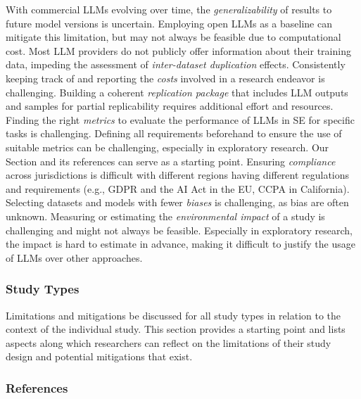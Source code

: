 With commercial LLMs evolving over time, the \emph{generalizability} of results to future model versions is uncertain.
Employing open LLMs as a baseline can mitigate this limitation, but may not always be feasible due to computational cost.
Most LLM providers do not publicly offer information about their training data, impeding the assessment of \emph{inter-dataset duplication} effects.
Consistently keeping track of and reporting the \emph{costs} involved in a research endeavor is challenging.
Building a coherent \emph{replication package} that includes LLM outputs and samples for partial replicability requires additional effort and resources.
Finding the right \emph{metrics} to evaluate the performance of LLMs in SE for specific tasks is challenging.
Defining all requirements beforehand to ensure the use of suitable metrics can be challenging, especially in exploratory research.
Our Section \benchmarksmetrics and its references can serve as a starting point.
Ensuring \emph{compliance} across jurisdictions is difficult with different regions having different regulations and requirements (e.g., GDPR and the AI Act in the EU, CCPA in California).
Selecting datasets and models with fewer \emph{biases} is challenging, as bias are often unknown.
Measuring or estimating the \emph{environmental impact} of a study is challenging and might not always be feasible.
Especially in exploratory research, the impact is hard to estimate in advance, making it difficult to justify the usage of LLMs over other approaches.

\subsubsection{Study Types}

Limitations and mitigations \should be discussed for all study types in relation to the context of the individual study.
This section provides a starting point and lists aspects along which researchers can reflect on the limitations of their study design and potential mitigations that exist.

\subsubsection{References}





